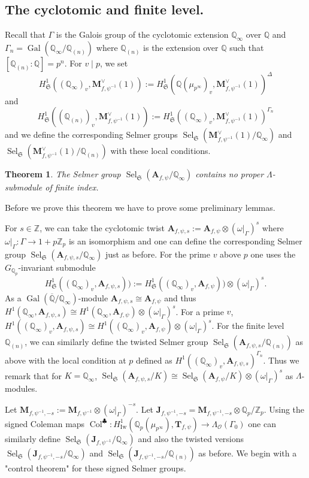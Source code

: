 \documentclass{amsart}
\newtheorem{theorem}{Theorem}[section]
\newcommand{\HIw}{H^1_{\mathrm{Iw}}}
\newcommand{\Q}{\mathbb{Q}}
\newcommand{\Z}{\mathbb{Z}}
\newcommand{\fS}{\mathfrak{S}}
\newcommand{\bJ}{\mathbf{J}}
\newcommand{\bT}{\mathbf{T}}
\newcommand{\bA}{\mathbf{A}}
\newcommand{\bM}{\mathbf{M}}
\newcommand{\Gal}{\operatorname{Gal}}
\newcommand{\col}{\operatorname{Col}}
\newcommand{\Sel}{\operatorname{Sel}}
\renewcommand{\O}{\mathcal{O}}
\newtheorem{auxiliary proposition}[theorem]{Auxiliary Proposition}
\newtheorem{main conjecture}[theorem]{Main Conjecture}
\newtheorem{main theorem}[theorem]{Main Theorem}
\newtheorem{modesty proposition}[theorem]{Modesty Proposition}
\newtheorem{open problem}[theorem]{Open Problem}
\newtheorem{convergence lemma}[theorem]{Convergence Lemma}
\newtheorem{corrected lemma}[theorem]{Corrected Lemma}
\newtheorem{growth lemma}[theorem]{Growth Lemma}
\newtheorem{coefficient lemma}[theorem]{Integrality Lemma}
\newtheorem{interpolation lemma}[theorem]{Interpolation Lemma}
\newtheorem{kernel lemma}[theorem]{Kernel Lemma}
\newtheorem{limit lemma}[theorem]{Limit Lemma}
\newtheorem{tandem lemma}[theorem]{Modesty Lemma}
\newtheorem{zero-finding lemma}[theorem]{Zero-Finding Lemma}
\begin{document}
\subsection{The cyclotomic and finite level.}  Recall that $\Gamma$ is the Galois group of the cyclotomic extension $\Q_\infty$ over $\Q$ and $\Gamma_n=\Gal(\Q_\infty/\Q_{(n)})$ where $\Q_{(n)}$ is the extension over $\Q$  such that $[\Q_{(n)}:\Q]=p^n$. For $v \mid p$, we set $$H^1_{\fS}((\Q_\infty)_v, \bM_{f, \psi^{-1}}^\vee(1)):=H^1_{\fS}(\Q(\mu_{p^\infty})_v, \bM_{f, \psi^{-1}}^\vee(1))^\Delta$$ and $$H^1_{\fS}((\Q_{(n)})_v, \bM_{f, \psi^{-1}}^\vee(1)):=H^1_{\fS}((\Q_\infty)_v, \bM_{f, \psi^{-1}}^\vee(1))^{\Gamma_n}$$
and we define the corresponding Selmer groups $\Sel_{\fS}(\bM_{f, \psi^{-1}}^\vee(1)/\Q_\infty)$ and $\Sel_{\fS}(\bM_{f, \psi^{-1}}^\vee(1)/\Q_{(n)})$ with these local conditions. 
\begin{theorem}\label{prop:finite}
    The Selmer group $\Sel_{\fS}(\bA_{f, \psi}/\Q_\infty)$ contains no proper $\Lambda$-submodule of finite index.
\end{theorem}
Before we prove this theorem we have to prove some preliminary lemmas. 
\vspace{.2cm}

For $s \in \Z$, we can take the cyclotomic twist $\bA_{f, \psi,s}:=\bA_{f, \psi} \otimes (\omega|_{\Gamma})^s$ where $\omega|_{\Gamma}:\Gamma \rightarrow 1+p\Z_p$ is an isomorphism and one can define the corresponding Selmer group $\Sel_{\fS}(\bA_{f, \psi,s}/\Q_\infty)$  just as before. For the prime $v$ above $p$ one uses the $G_{\Q_p}$-invariant submodule $$H^1_{\fS}((\Q_\infty)_v, \bA_{f, \psi, s})):=H^1_{\fS}((\Q_\infty)_v, \bA_{f, \psi}))\otimes (\omega|_{\Gamma})^s.$$
As a $\Gal(\overline{\Q}/\Q_\infty)$-module $\bA_{f, \psi, s} \cong \bA_{f, \psi}$ and thus $H^1(\Q_\infty, \bA_{f, \psi, s}) \cong H^1(\Q_\infty, \bA_{f, \psi}) \otimes (\omega|_{\Gamma})^s $. For a prime $v$, $H^1((\Q_\infty)_v, \bA_{f, \psi, s}) \cong H^1((\Q_\infty)_v, \bA_{f, \psi}) \otimes (\omega|_{\Gamma})^s$. For the finite level $\Q_{(n)}$, we can similarly define the twisted Selmer group $\Sel_{\fS}(\bA_{f, \psi,s}/\Q_{(n)})$ as above with the local condition at $p$ defined as $H^1((\Q_\infty)_v, \bA_{f, \psi, s})^{\Gamma_n}$. Thus we remark that for $K=\Q_\infty$, $\Sel_{\fS}(\bA_{f, \psi,s}/K)\cong \Sel_{\fS}(\bA_{f, \psi}/K)\otimes (\omega|_{\Gamma})^s$ as $\Lambda$-modules. 
\vspace{.2cm}

Let $\bM_{f, \psi^{-1}, -s}:=\bM_{f, \psi^{-1}} \otimes (\omega|_{\Gamma})^{-s}$. Let $\bJ_{f,\psi^{-1},-s}=\bM_{f, \psi^{-1}, -s} \otimes \Q_p/\Z_p $. Using the signed Coleman maps 
$\col^\clubsuit:\HIw(\Q_p(\mu_{p^\infty}),\bT_{f, \psi}) \rightarrow \Lambda_{\O}(\Gamma_0)$ one can similarly define $\Sel_{\mathfrak{S}}(\mathbf{J}_{f,\psi^{-1}}/\Q_\infty)$ and also the twisted versions $\Sel_{\fS}(\bJ_{f,\psi^{-1},-s}/\Q_\infty)$ and $\Sel_{\fS}(\bJ_{f,\psi^{-1},-s}/\Q_{(n)} )$ as before.
We begin with a "control theorem" for these signed Selmer groups.
\end{document}
